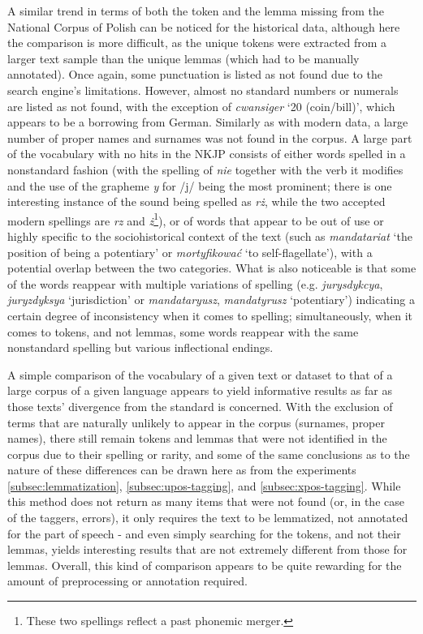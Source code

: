 A similar trend in terms of both the token and the lemma missing from the National Corpus of Polish can be noticed for the historical data, although here the comparison is more difficult, as the unique tokens were extracted from a larger text sample than the unique lemmas (which had to be manually annotated). Once again, some punctuation is listed as not found due to the search engine's limitations. However, almost no standard numbers or numerals are listed as not found, with the exception of \textit{cwansiger} `20 (coin/bill)', which appears to be a borrowing from German. Similarly as with modern data, a large number of proper names and surnames was not found in the corpus. A large part of the vocabulary with no hits in the NKJP consists of either words spelled in a nonstandard fashion (with the spelling of \textit{nie} together with the verb it modifies and the use of the grapheme \textit{y} for /j/ being the most prominent; there is one interesting instance of the sound \textipa{/\textrtailz/} being spelled as \textit{rż}, while the two accepted modern spellings are \textit{rz} and \textit{ż}\footnote{These two spellings reflect a past phonemic merger.}), or of words that appear to be out of use or highly specific to the sociohistorical context of the text (such as \textit{mandatariat} `the position of being a potentiary' or \textit{mortyfikować} `to self-flagellate'), with a potential overlap between the two categories. What is also noticeable is that some of the words reappear with multiple variations of spelling (e.g. \textit{jurysdykcya}, \textit{juryzdyksya} `jurisdiction' or \textit{mandataryusz}, \textit{mandatyrusz} `potentiary') indicating a certain degree of inconsistency when it comes to spelling; simultaneously, when it comes to tokens, and not lemmas, some words reappear with the same nonstandard spelling but various inflectional endings.

A simple comparison of the vocabulary of a given text or dataset to that of a large corpus of a given language appears to yield informative results as far as those texts' divergence from the standard is concerned. With the exclusion of terms that are naturally unlikely to appear in the corpus (surnames, proper names), there still remain tokens and lemmas that were not identified in the corpus due to their spelling or rarity, and some of the same conclusions as to the nature of these differences can be drawn here as from the experiments \autoref{subsec:lemmatization}, \autoref{subsec:upos-tagging}, and \autoref{subsec:xpos-tagging}. While this method does not return as many items that were not found (or, in the case of the taggers, errors), it only requires the text to be lemmatized, not annotated for the part of speech - and even simply searching for the tokens, and not their lemmas, yields interesting results that are not extremely different from those for lemmas. Overall, this kind of comparison appears to be quite rewarding for the amount of preprocessing or annotation required.